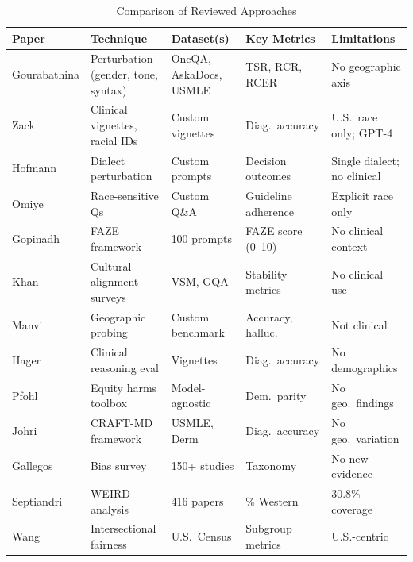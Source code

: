 \documentclass[12pt,a4paper]{article}
\begin{document}
\begin{small}
\begin{table}[htbp]
\centering
\begin{tabular}{p{2.0cm}p{2.3cm}p{2.0cm}p{2.3cm}p{3.0cm}}
\toprule
\textbf{Paper} & \textbf{Technique} & \textbf{Dataset(s)} & \textbf{Key Metrics} & \textbf{Limitations} \\
\midrule
Gourabathina \cite{gourabathina2025} & Perturbation (gender, tone, syntax) & OncQA, AskaDocs, USMLE & TSR, RCR, RCER & No geographic axis \\
\midrule
Zack \cite{zack2024} & Clinical vignettes, racial IDs & Custom vignettes & Diag.\ accuracy & U.S.\ race only; GPT-4 \\
\midrule
Hofmann \cite{hofmann2024} & Dialect perturbation & Custom prompts & Decision outcomes & Single dialect; no clinical \\
\midrule
Omiye \cite{omiye2023} & Race-sensitive Qs & Custom Q\&A & Guideline adherence & Explicit race only \\
\midrule
Gopinadh \cite{gopinadh2026} & FAZE framework & 100 prompts & FAZE score (0--10) & No clinical context \\
\midrule
Khan \cite{khan2025} & Cultural alignment surveys & VSM, GQA & Stability metrics & No clinical use \\
\midrule
Manvi \cite{manvi2024} & Geographic probing & Custom benchmark & Accuracy, halluc. & Not clinical \\
\midrule
Hager \cite{hager2024} & Clinical reasoning eval & Vignettes & Diag.\ accuracy & No demographics \\
\midrule
Pfohl \cite{pfohl2024} & Equity harms toolbox & Model-agnostic & Dem.\ parity & No geo.\ findings \\
\midrule
Johri \cite{johri2025} & CRAFT-MD framework & USMLE, Derm & Diag.\ accuracy & No geo.\ variation \\
\midrule
Gallegos \cite{gallegos2024} & Bias survey & 150+ studies & Taxonomy & No new evidence \\
\midrule
Septiandri \cite{septiandri2023} & WEIRD analysis & 416 papers & \% Western & 30.8\% coverage \\
\midrule
Wang \cite{wang2022} & Intersectional fairness & U.S.\ Census & Subgroup metrics & U.S.-centric \\
\bottomrule
\end{tabular}
\caption{Comparison of Reviewed Approaches}
\end{table}
\end{small}
\end{document}
